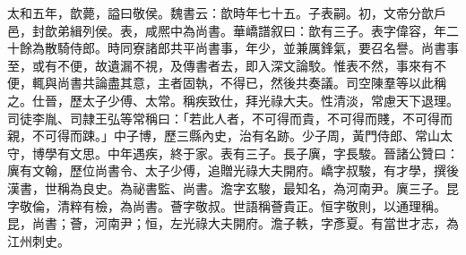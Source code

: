 \begin{pinyinscope}
太和五年，歆薨，謚曰敬侯。魏書云：歆時年七十五。子表嗣。初，文帝分歆戶邑，封歆弟緝列侯。表，咸熈中為尚書。華嶠譜叙曰：歆有三子。表字偉容，年二十餘為散騎侍郎。時同寮諸郎共平尚書事，年少，並兼厲鋒氣，要召名譽。尚書事至，或有不便，故遺漏不視，及傳書者去，即入深文論駮。惟表不然，事來有不便，輒與尚書共論盡其意，主者固執，不得已，然後共奏議。司空陳羣等以此稱之。仕晉，歷太子少傅、太常。稱疾致仕，拜光祿大夫。性清淡，常慮天下退理。司徒李胤、司隷王弘等常稱曰：「若此人者，不可得而貴，不可得而賤，不可得而親，不可得而踈。」中子博，歷三縣內史，治有名跡。少子周，黃門侍郎、常山太守，博學有文思。中年遇疾，終于家。表有三子。長子廙，字長駿。晉諸公贊曰：廙有文翰，歷位尚書令、太子少傅，追贈光祿大夫開府。嶠字叔駿，有才學，撰後漢書，世稱為良史。為祕書監、尚書。澹字玄駿，最知名，為河南尹。廙三子。昆字敬倫，清粹有檢，為尚書。薈字敬叔。世語稱薈貴正。恒字敬則，以通理稱。昆，尚書；薈，河南尹；恒，左光祿大夫開府。澹子軼，字彥夏。有當世才志，為江州刺史。


\end{pinyinscope}
